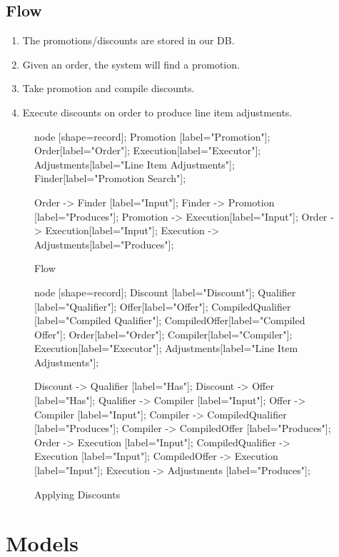 \documentclass[11pt]{article}
\begin{document}
\subsection{Flow}

\begin{enumerate}

    \item The promotions/discounts are stored in our DB. 
    \item Given an order, the system will find a promotion.
    \item Take promotion and compile discounts.
    \item Execute discounts on order to produce line item adjustments.
\end{enumerate}

\begin{figure}
\caption{Flow}
 {
    node [shape=record];
    Promotion [label="Promotion"];
    Order[label="Order"];
    Execution[label="Executor"];
    Adjustments[label="Line Item Adjustments"];
    Finder[label="Promotion Search"];

    Order -> Finder [label="Input"];
    Finder -> Promotion [label="Produces"];
    Promotion -> Execution[label="Input"];
    Order -> Execution[label="Input"];
    Execution -> Adjustments[label="Produces"];
}
\end{figure}

\begin{figure}
\caption{Applying Discounts}
 {
    node [shape=record];
    Discount [label="Discount"];
    Qualifier [label="Qualifier"];
    Offer[label="Offer"];
    CompiledQualifier [label="Compiled Qualifier"];
    CompiledOffer[label="Compiled Offer"];
    Order[label="Order"];
    Compiler[label="Compiler"];
    Execution[label="Executor"];
    Adjustments[label="Line Item Adjustments"];

    Discount -> Qualifier [label="Has"];
    Discount -> Offer [label="Has"];
    Qualifier -> Compiler [label="Input"];
    Offer -> Compiler [label="Input"];
    Compiler -> CompiledQualifier [label="Produces"];
    Compiler -> CompiledOffer [label="Produces"];
    Order -> Execution [label="Input"];
    CompiledQualifier -> Execution [label="Input"];
    CompiledOffer -> Execution [label="Input"];
    Execution -> Adjustments [label="Produces"];
}
\end{figure}

\section{Models}
\end{document}
